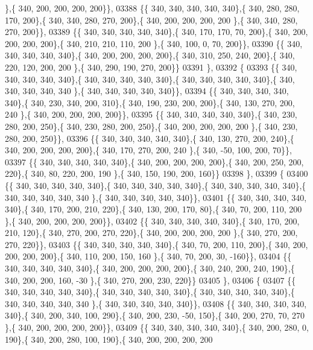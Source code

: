 \begin{DoxyCode}
      \},\{ 340, 200, 200, 200, 200\}\},
03388 \{\{ 340, 340, 340, 340, 340\},\{ 340, 280, 280, 170, 200\},\{ 340, 340, 280, 270, 200\},\{ 340, 200, 200, 200, 200
      \},\{ 340, 340, 280, 270, 200\}\},
03389 \{\{ 340, 340, 340, 340, 340\},\{ 340, 170, 170,  70, 200\},\{ 340, 200, 200, 200, 200\},\{ 340, 210, 210, 110, 200
      \},\{ 340, 100,   0,  70, 200\}\},
03390 \{\{ 340, 340, 340, 340, 340\},\{ 340, 200, 200, 200, 200\},\{ 340, 310, 250, 240, 200\},\{ 340, 220, 120, 200, 200
      \},\{ 340, 290, 190, 270, 200\}\}
03391 \},
03392 \{
03393 \{\{ 340, 340, 340, 340, 340\},\{ 340, 340, 340, 340, 340\},\{ 340, 340, 340, 340, 340\},\{ 340, 340, 340, 340, 340
      \},\{ 340, 340, 340, 340, 340\}\},
03394 \{\{ 340, 340, 340, 340, 340\},\{ 340, 230, 340, 200, 310\},\{ 340, 190, 230, 200, 200\},\{ 340, 130, 270, 200, 240
      \},\{ 340, 200, 200, 200, 200\}\},
03395 \{\{ 340, 340, 340, 340, 340\},\{ 340, 230, 280, 200, 250\},\{ 340, 230, 280, 200, 250\},\{ 340, 200, 200, 200, 200
      \},\{ 340, 230, 280, 200, 250\}\},
03396 \{\{ 340, 340, 340, 340, 340\},\{ 340, 130, 270, 200, 240\},\{ 340, 200, 200, 200, 200\},\{ 340, 170, 270, 200, 240
      \},\{ 340, -50, 100, 200,  70\}\},
03397 \{\{ 340, 340, 340, 340, 340\},\{ 340, 200, 200, 200, 200\},\{ 340, 200, 250, 200, 220\},\{ 340,  80, 220, 200, 190
      \},\{ 340, 150, 190, 200, 160\}\}
03398 \},
03399 \{
03400 \{\{ 340, 340, 340, 340, 340\},\{ 340, 340, 340, 340, 340\},\{ 340, 340, 340, 340, 340\},\{ 340, 340, 340, 340, 340
      \},\{ 340, 340, 340, 340, 340\}\},
03401 \{\{ 340, 340, 340, 340, 340\},\{ 340, 170, 200, 210, 220\},\{ 340, 130, 200, 170,  80\},\{ 340,  70, 200, 110, 200
      \},\{ 340, 200, 200, 200, 200\}\},
03402 \{\{ 340, 340, 340, 340, 340\},\{ 340, 170, 200, 210, 120\},\{ 340, 270, 200, 270, 220\},\{ 340, 200, 200, 200, 200
      \},\{ 340, 270, 200, 270, 220\}\},
03403 \{\{ 340, 340, 340, 340, 340\},\{ 340,  70, 200, 110, 200\},\{ 340, 200, 200, 200, 200\},\{ 340, 110, 200, 150, 160
      \},\{ 340,  70, 200,  30, -160\}\},
03404 \{\{ 340, 340, 340, 340, 340\},\{ 340, 200, 200, 200, 200\},\{ 340, 240, 200, 240, 190\},\{ 340, 200, 200, 160, -30
      \},\{ 340, 270, 200, 230, 220\}\}
03405 \},
03406 \{
03407 \{\{ 340, 340, 340, 340, 340\},\{ 340, 340, 340, 340, 340\},\{ 340, 340, 340, 340, 340\},\{ 340, 340, 340, 340, 340
      \},\{ 340, 340, 340, 340, 340\}\},
03408 \{\{ 340, 340, 340, 340, 340\},\{ 340, 200, 340, 100, 290\},\{ 340, 200, 230, -50, 150\},\{ 340, 200, 270,  70, 270
      \},\{ 340, 200, 200, 200, 200\}\},
03409 \{\{ 340, 340, 340, 340, 340\},\{ 340, 200, 280,   0, 190\},\{ 340, 200, 280, 100, 190\},\{ 340, 200, 200, 200, 200

\end{DoxyCode}
